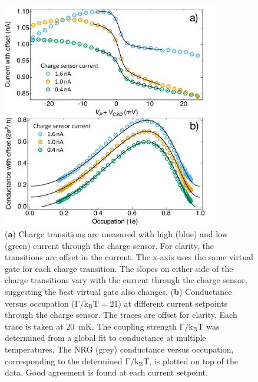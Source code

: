 \begin{figure}[!hbt]
 \begin{center}
 \includegraphics[width=0.85\textwidth]{figures/ch3/figure17.pdf}
 \caption[Conductance versus Occupation : Varying Charge Sensor Current]{\label{fig:ch3/cond_occ_QPC_vs_ct}  
 (\textbf{a}) Charge transitions are measured with high (blue) and low (green) current through the charge sensor. For clarity, the transitions are offset in the current. The x-axis uses the same virtual gate for each charge transition. The slopes on either side of the charge transitions vary with the current through the charge sensor, suggesting the best virtual gate also changes. (\textbf{b}) Conductance versus occupation ($\mathrm{\Gamma/k_BT=21}$) at different current setpoints through the charge sensor. The traces are offset for clarity. Each trace is taken at \qty{20}{mK}. The coupling strength $\mathrm{\Gamma/k_BT}$ was determined from a global fit to conductance at multiple temperatures. The NRG (grey) conductance versus occupation, corresponding to the determined $\mathrm{\Gamma/k_BT}$, is plotted on top of the data. Good agreement is found at each current setpoint.}
 \end{center}
\end{figure}


